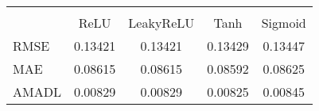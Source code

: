 \begin{tabular}{lcccc}
\hline\hline \\ [-1.8ex]
 & ReLU & LeakyReLU & Tanh & Sigmoid \\ 
 \hline 
RMSE & 0.13421 & 0.13421 & 0.13429 & 0.13447 \\ 
MAE & 0.08615 & 0.08615 & 0.08592 & 0.08625 \\ 
AMADL & 0.00829 & 0.00829 & 0.00825 & 0.00845 \\ 
\hline\hline
\end{tabular}